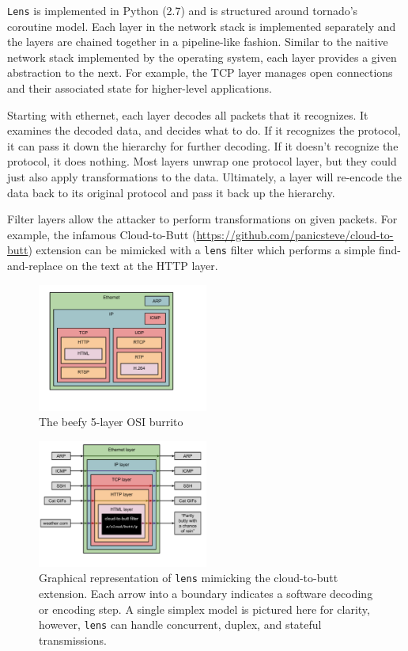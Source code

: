 \documentclass[12pt]{article}
\begin{document}
    \texttt{Lens} is implemented in Python (2.7) and is structured around tornado’s coroutine model. Each layer in the network stack is implemented separately and the layers are chained together in a pipeline-like fashion. Similar to the naitive network stack implemented by the operating system, each layer provides a given abstraction to the next. For example, the TCP layer manages open connections and their associated state for higher-level applications.

Starting with ethernet, each layer decodes all packets that it recognizes. It examines the decoded data, and decides what to do. If it recognizes the protocol, it can pass it down the hierarchy for further decoding. If it doesn’t recognize the protocol, it does nothing. Most layers unwrap one protocol layer, but they could just also apply transformations to the data. Ultimately, a layer will re-encode the data back to its original protocol and pass it back up the hierarchy.

Filter layers allow the attacker to perform transformations on given packets. For example, the infamous Cloud-to-Butt (\url{https://github.com/panicsteve/cloud-to-butt}) extension can be mimicked with a \texttt{lens} filter which performs a simple find-and-replace on the text at the HTTP layer.

\begin{figure}[h]
    \centering
    \includegraphics[width=0.5\textwidth]{osi_layers}
    \caption{The beefy 5-layer OSI burrito}
\end{figure}

\begin{figure}[h]
    \centering
    \includegraphics[width=0.5\textwidth]{lens_c2b}
    \caption{Graphical representation of \texttt{lens} mimicking the cloud-to-butt extension. Each arrow into a boundary indicates a software decoding or encoding step. A single simplex model is pictured here for clarity, however, \texttt{lens} can handle concurrent, duplex, and stateful transmissions.}
\end{figure}
\end{document}
